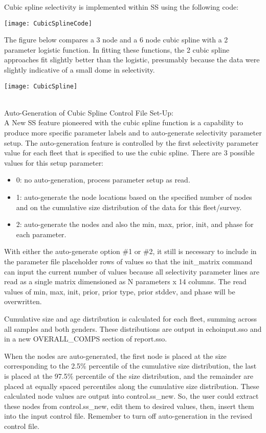 Cubic spline selectivity is implemented within SS using the following code:\\
\begin{center}
	\texttt{[image: CubicSplineCode]}
\end{center}

The figure below compares a 3 node and a 6 node cubic spline with a 2 parameter logistic function.  In fitting these functions, the 2 cubic spline approaches fit slightly better than the logistic, presumably because the data were slightly indicative of a small dome in selectivity.\\
\begin{center}
	\texttt{[image: CubicSpline]}
\end{center}
\hfil
\\
Auto-Generation of Cubic Spline Control File Set-Up:\\
A New SS feature pioneered with the cubic spline function is a capability to produce more specific parameter labels and to auto-generate selectivity parameter setup.  The auto-generation feature is controlled by the first selectivity parameter value for each fleet that is specified to use the cubic spline.  There are 3 possible values for this setup parameter:
\begin{itemize}
	\item 0: no auto-generation, process parameter setup as read.
	\item 1: auto-generate the node locations based on the specified number of nodes and on the cumulative size distribution of the data for this fleet/survey.
	\item 2: auto-generate the nodes and also the min, max, prior, init, and phase for each parameter.
\end{itemize}

With either the auto-generate option \#1 or \#2, it still is necessary to include in the parameter file placeholder rows of values so that the init\_matrix command can input the current number of values because all selectivity parameter lines are read as a single matrix dimensioned as N parameters x 14 columns.  The read values of min, max, init, prior, prior type, prior stddev, and phase will be overwritten.

Cumulative size and age distribution is calculated for each fleet, summing across all samples and both genders.  These distributions are output in echoinput.sso and in a new OVERALL\_COMPS section of report.sso.

When the nodes are auto-generated, the first node is placed at the size corresponding to the 2.5\% percentile of the cumulative size distribution, the last is placed at the 97.5\% percentile of the size distribution, and the remainder are placed at equally spaced percentiles along the cumulative size distribution.  These calculated node values are output into control.ss\_new.  So, the user could extract these nodes from control.ss\_new, edit them to desired values, then, insert them into the input control file.  Remember to turn off auto-generation in the revised control file.

